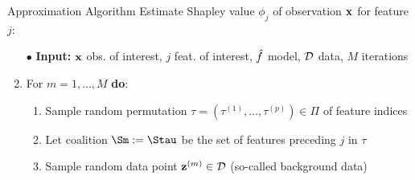 \documentclass[10pt,compress,t,notes=noshow, xcolor=table]{beamer}
\begin{document}
\begin{frame}{Approximation Algorithm }
Estimate Shapley value $\phi_j$ of observation $\mathbf{x}$ for feature $j$:

  \begin{enumerate}[<+->]
  \item[$\bullet$] \textbf{Input:} $\mathbf{x}$ obs. of interest, $j$ feat. of interest, $\hat{f}$ model, $\mathcal{D}$ data, $M$ iterations
      \item For $m = 1, \ldots, M$ \textbf{do}:
      \begin{enumerate}
        \item Sample random permutation $\tau = (\tau^{(1)}, \ldots, \tau^{(p)}) \in \Pi$ of feature indices%
        \item Let coalition $\Sm := \Stau$ be the set of features preceding $j$ in $\tau$
        \item Sample random data point {\color{blue} $\mathbf{z}^{(m)} \in \mathcal{D}$} (so-called background data)%

\end{enumerate}
\end{enumerate}
\end{frame}
\end{document}
